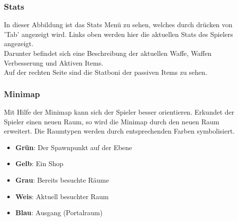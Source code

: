 \subsubsection{Stats}
In dieser Abbildung ist das Stats Menü zu sehen, welches durch drücken von 'Tab' angezeigt wird. Links oben werden hier die aktuellen Stats des Spielers angezeigt.\\
Darunter befindet sich eine Beschreibung der aktuellen Waffe, Waffen Verbesserung und Aktiven Items.\\
Auf der rechten Seite sind die Statboni der passiven Items zu sehen.

\subsubsection{Minimap}

Mit Hilfe der Minimap kann sich der Spieler besser orientieren. Erkundet der Spieler einen neuen Raum, so wird die Minimap durch den neuen Raum erweitert. Die Raumtypen werden durch entsprechenden Farben symbolisiert.

\begin{itemize}
\item \textbf{Grün}: Der Spawnpunkt auf der Ebene
\item \textbf{Gelb}: Ein Shop
\item \textbf{Grau}: Bereits besuchte Räume
\item \textbf{Weis}: Aktuell besuchter Raum
\item \textbf{Blau}: Ausgang (Portalraum)
\end{itemize}



